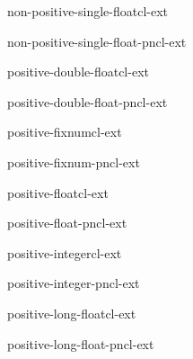 \begin{type}{non-positive-single-float}{}{cl-ext}{}
  
\end{type}

\begin{function}{non-positive-single-float-p}{n}{cl-ext}{}
  
\end{function}

\begin{type}{positive-double-float}{}{cl-ext}{}
  
\end{type}

\begin{function}{positive-double-float-p}{n}{cl-ext}{}
  
\end{function}

\begin{type}{positive-fixnum}{}{cl-ext}{}
  
\end{type}

\begin{function}{positive-fixnum-p}{n}{cl-ext}{}
  
\end{function}

\begin{type}{positive-float}{}{cl-ext}{}
  
\end{type}

\begin{function}{positive-float-p}{n}{cl-ext}{}
  
\end{function}

\begin{type}{positive-integer}{}{cl-ext}{}
  
\end{type}

\begin{function}{positive-integer-p}{n}{cl-ext}{}
  
\end{function}

\begin{type}{positive-long-float}{}{cl-ext}{}
  
\end{type}

\begin{function}{positive-long-float-p}{n}{cl-ext}{}
  
\end{function}

